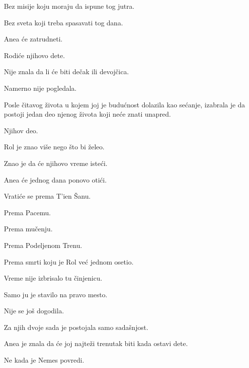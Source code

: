 \bigskip

Bez misije koju moraju da ispune tog jutra.

Bez sveta koji treba spasavati tog dana.

\bigskip

Anea će zatrudneti.

\bigskip

Rodiće njihovo dete.

\bigskip

Nije znala da li će biti dečak ili devojčica.

\bigskip

Namerno nije pogledala.

\bigskip

Posle čitavog života u kojem joj je budućnost dolazila kao sećanje, izabrala je da postoji jedan deo njenog života koji neće znati unapred.

\bigskip

Njihov deo.

\bigskip

Rol je znao više nego što bi želeo.

\bigskip

Znao je da će njihovo vreme isteći.

\bigskip

Anea će jednog dana ponovo otići.

\bigskip

Vratiće se prema T'ien Šanu.

Prema Pacemu.

Prema mučenju.

Prema Podeljenom Trenu.

\bigskip

Prema smrti koju je Rol već jednom osetio.

\bigskip

Vreme nije izbrisalo tu činjenicu.

\bigskip

Samo ju je stavilo na pravo mesto.

\bigskip

Nije se još dogodila.

\bigskip

Za njih dvoje sada je postojala samo sadašnjost.

\bigskip

Anea je znala da će joj najteži trenutak biti kada ostavi dete.

\bigskip

Ne kada je Nemes povredi.

